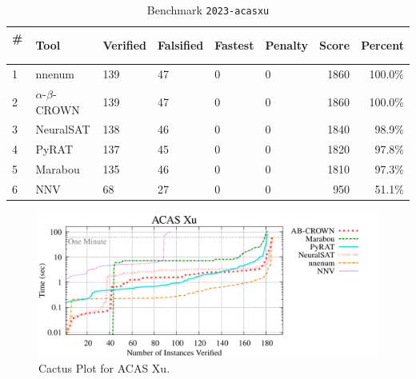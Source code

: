 

\begin{table}[h]
\begin{center}
\caption{Benchmark \texttt{2023-acasxu}} \label{tab:cat_{cat}}
{\setlength{\tabcolsep}{2pt}
\begin{tabular}[h]{@{}llllllrr@{}}
\toprule
\textbf{\# ~} & \textbf{Tool} & \textbf{Verified} & \textbf{Falsified} & \textbf{Fastest} & \textbf{Penalty} & \textbf{Score} & \textbf{Percent}\\
\midrule
1 & nnenum & 139 & 47 & 0 & 0 & 1860 & 100.0\% \\
2 & $\alpha$-$\beta$-CROWN & 139 & 47 & 0 & 0 & 1860 & 100.0\% \\
3 & NeuralSAT & 138 & 46 & 0 & 0 & 1840 & 98.9\% \\
4 & PyRAT & 137 & 45 & 0 & 0 & 1820 & 97.8\% \\
5 & Marabou & 135 & 46 & 0 & 0 & 1810 & 97.3\% \\
6 & NNV & 68 & 27 & 0 & 0 & 950 & 51.1\% \\
\bottomrule
\end{tabular}
}
\end{center}
\end{table}



\begin{figure}[h]
\centerline{\includegraphics[width=\textwidth]{cactus/2023_acasxu.pdf}}
\caption{Cactus Plot for ACAS Xu.}
\label{fig:quantPic}
\end{figure}



